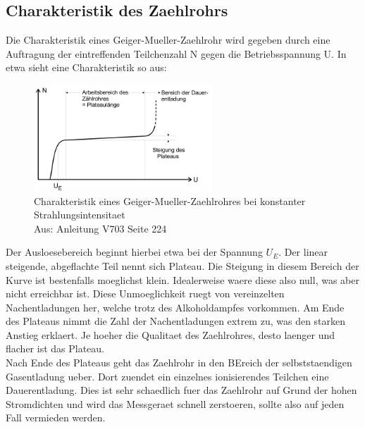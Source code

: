 \documentclass[titlepage=firstcover, captions=tableheading]{scrartcl}
\begin{document}
\subsection{Charakteristik des Zaehlrohrs}
Die Charakteristik eines Geiger-Mueller-Zaehlrohr wird gegeben durch eine Auftragung der eintreffenden Teilchenzahl N gegen die Betriebsspannung U. In etwa sieht eine Charakteristik so aus:
\begin{figure}[H]
    \centering
    \includegraphics[width=0.6\textwidth]{"Charakteristik_Geiger.png"}
    \caption{Charakteristik eines Geiger-Mueller-Zaehlrohres bei konstanter Strahlungsintensitaet \\ Aus: Anleitung V703 Seite 224}
    \label{Fig:Charakteristik}
\end{figure}
\noindent Der Ausloesebereich beginnt hierbei etwa bei der Spannung $U_E$. Der linear steigende, abgeflachte Teil nennt sich Plateau. Die Steigung in diesem Bereich der Kurve ist bestenfalls moeglichst klein. Idealerweise waere diese also null, was aber nicht erreichbar ist. Diese Unmoeglichkeit ruegt von vereinzelten Nachentladungen her, welche trotz des Alkoholdampfes vorkommen. Am Ende des Plateaus nimmt die Zahl der Nachentladungen extrem zu, was den starken Anstieg erklaert. Je hoeher die Qualitaet des Zaehlrohres, desto laenger und flacher ist das Plateau.\\
Nach Ende des Plateaus geht das Zaehlrohr in den BEreich der selbststaendigen Gasentladung ueber. Dort zuendet ein einzelnes ionisierendes Teilchen eine Dauerentladung. Dies ist sehr schaedlich fuer das Zaehlrohr auf Grund der hohen Stromdichten und wird das Messgeraet schnell zerstoeren, sollte also auf jeden Fall vermieden werden.
\end{document}
